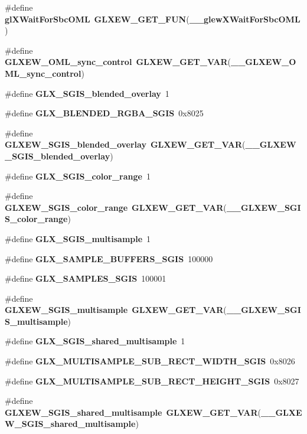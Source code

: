 \begin{DoxyCompactItemize}
\item 
\#define {\bf gl\+X\+Wait\+For\+Sbc\+O\+ML}~{\bf G\+L\+X\+E\+W\+\_\+\+G\+E\+T\+\_\+\+F\+UN}({\bf \+\_\+\+\_\+glew\+X\+Wait\+For\+Sbc\+O\+ML})
\item 
\#define {\bf G\+L\+X\+E\+W\+\_\+\+O\+M\+L\+\_\+sync\+\_\+control}~{\bf G\+L\+X\+E\+W\+\_\+\+G\+E\+T\+\_\+\+V\+AR}({\bf \+\_\+\+\_\+\+G\+L\+X\+E\+W\+\_\+\+O\+M\+L\+\_\+sync\+\_\+control})
\item 
\#define {\bf G\+L\+X\+\_\+\+S\+G\+I\+S\+\_\+blended\+\_\+overlay}~1
\item 
\#define {\bf G\+L\+X\+\_\+\+B\+L\+E\+N\+D\+E\+D\+\_\+\+R\+G\+B\+A\+\_\+\+S\+G\+IS}~0x8025
\item 
\#define {\bf G\+L\+X\+E\+W\+\_\+\+S\+G\+I\+S\+\_\+blended\+\_\+overlay}~{\bf G\+L\+X\+E\+W\+\_\+\+G\+E\+T\+\_\+\+V\+AR}({\bf \+\_\+\+\_\+\+G\+L\+X\+E\+W\+\_\+\+S\+G\+I\+S\+\_\+blended\+\_\+overlay})
\item 
\#define {\bf G\+L\+X\+\_\+\+S\+G\+I\+S\+\_\+color\+\_\+range}~1
\item 
\#define {\bf G\+L\+X\+E\+W\+\_\+\+S\+G\+I\+S\+\_\+color\+\_\+range}~{\bf G\+L\+X\+E\+W\+\_\+\+G\+E\+T\+\_\+\+V\+AR}({\bf \+\_\+\+\_\+\+G\+L\+X\+E\+W\+\_\+\+S\+G\+I\+S\+\_\+color\+\_\+range})
\item 
\#define {\bf G\+L\+X\+\_\+\+S\+G\+I\+S\+\_\+multisample}~1
\item 
\#define {\bf G\+L\+X\+\_\+\+S\+A\+M\+P\+L\+E\+\_\+\+B\+U\+F\+F\+E\+R\+S\+\_\+\+S\+G\+IS}~100000
\item 
\#define {\bf G\+L\+X\+\_\+\+S\+A\+M\+P\+L\+E\+S\+\_\+\+S\+G\+IS}~100001
\item 
\#define {\bf G\+L\+X\+E\+W\+\_\+\+S\+G\+I\+S\+\_\+multisample}~{\bf G\+L\+X\+E\+W\+\_\+\+G\+E\+T\+\_\+\+V\+AR}({\bf \+\_\+\+\_\+\+G\+L\+X\+E\+W\+\_\+\+S\+G\+I\+S\+\_\+multisample})
\item 
\#define {\bf G\+L\+X\+\_\+\+S\+G\+I\+S\+\_\+shared\+\_\+multisample}~1
\item 
\#define {\bf G\+L\+X\+\_\+\+M\+U\+L\+T\+I\+S\+A\+M\+P\+L\+E\+\_\+\+S\+U\+B\+\_\+\+R\+E\+C\+T\+\_\+\+W\+I\+D\+T\+H\+\_\+\+S\+G\+IS}~0x8026
\item 
\#define {\bf G\+L\+X\+\_\+\+M\+U\+L\+T\+I\+S\+A\+M\+P\+L\+E\+\_\+\+S\+U\+B\+\_\+\+R\+E\+C\+T\+\_\+\+H\+E\+I\+G\+H\+T\+\_\+\+S\+G\+IS}~0x8027
\item 
\#define {\bf G\+L\+X\+E\+W\+\_\+\+S\+G\+I\+S\+\_\+shared\+\_\+multisample}~{\bf G\+L\+X\+E\+W\+\_\+\+G\+E\+T\+\_\+\+V\+AR}({\bf \+\_\+\+\_\+\+G\+L\+X\+E\+W\+\_\+\+S\+G\+I\+S\+\_\+shared\+\_\+multisample})

\end{DoxyCompactItemize}
